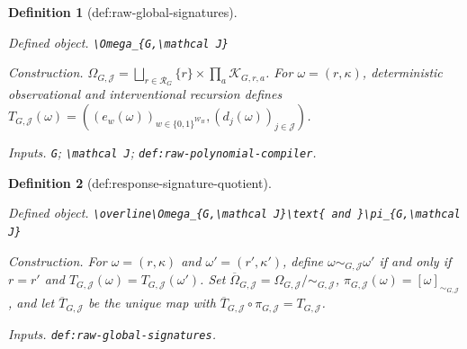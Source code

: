 \documentclass{article}
\newtheorem{definition}{Definition}
\begin{document}
\begin{definition}[def:raw-global-signatures]\label{def:raw-global-signatures}
\par\smallskip\noindent\emph{Defined object.} \texttt{\textbackslash{}\allowbreak{}Omega\_\allowbreak{}\{G,\allowbreak{}\textbackslash{}\allowbreak{}mathcal J\}\allowbreak{}}
\par\smallskip\noindent\emph{Construction.} \(\Omega_{G,\mathcal J}=\bigsqcup_{r\in\mathcal R_G}\{r\}\times\prod_a\mathcal K_{G,r,a}\). For \(\omega=(r,\kappa)\), deterministic observational and interventional recursion defines \(T_{G,\mathcal J}(\omega)=((e_w(\omega))_{w\in\{0,1\}^{\mathcal W_H}},(d_j(\omega))_{j\in\mathcal J})\).
\par\smallskip\noindent\emph{Inputs.} \texttt{G}; \texttt{\textbackslash{}\allowbreak{}mathcal J}; \texttt{def:\allowbreak{}raw-\allowbreak{}polynomial-\allowbreak{}compiler}.
\end{definition}

\begin{definition}[def:response-signature-quotient]\label{def:response-signature-quotient}
\par\smallskip\noindent\emph{Defined object.} \texttt{\textbackslash{}\allowbreak{}overline\textbackslash{}\allowbreak{}Omega\_\allowbreak{}\{G,\allowbreak{}\textbackslash{}\allowbreak{}mathcal J\}\allowbreak{}\textbackslash{}\allowbreak{}text\{ and \}\allowbreak{}\textbackslash{}\allowbreak{}pi\_\allowbreak{}\{G,\allowbreak{}\textbackslash{}\allowbreak{}mathcal J\}\allowbreak{}}
\par\smallskip\noindent\emph{Construction.} For \(\omega=(r,\kappa)\) and \(\omega'=(r',\kappa')\), define \(\omega\sim_{G,\mathcal J}\omega'\) if and only if \(r=r'\) and \(T_{G,\mathcal J}(\omega)=T_{G,\mathcal J}(\omega')\). Set \(\overline\Omega_{G,\mathcal J}=\Omega_{G,\mathcal J}/\!\sim_{G,\mathcal J}\), \(\pi_{G,\mathcal J}(\omega)=[\omega]_{\sim_{G,\mathcal J}}\), and let \(\overline T_{G,\mathcal J}\) be the unique map with \(\overline T_{G,\mathcal J}\circ\pi_{G,\mathcal J}=T_{G,\mathcal J}\).
\par\smallskip\noindent\emph{Inputs.} \texttt{def:\allowbreak{}raw-\allowbreak{}global-\allowbreak{}signatures}.
\end{definition}
\end{document}
